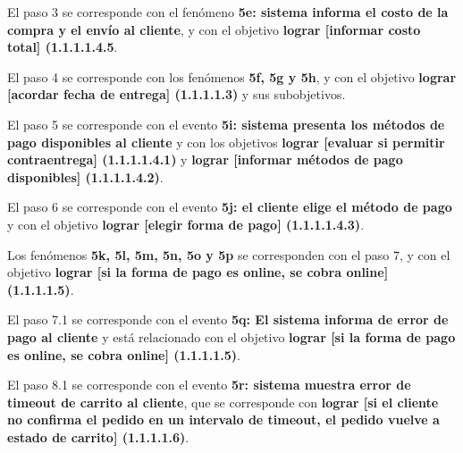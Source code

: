 El paso 3 se corresponde con el fenómeno \textbf{5e: sistema informa el costo de la compra y el envío al cliente}, y con el objetivo \textbf{lograr [informar costo total] (1.1.1.1.4.5}.

El paso 4 se corresponde con los fenómenos \textbf{5f, 5g y 5h}, y con el objetivo \textbf{lograr [acordar fecha de entrega] (1.1.1.1.3)} y sus subobjetivos.

El paso 5 se corresponde con el evento \textbf{5i: sistema presenta los métodos de pago disponibles al cliente} y con los objetivos \textbf{lograr [evaluar si permitir contraentrega] (1.1.1.1.4.1)} y \textbf{lograr [informar métodos de pago disponibles] (1.1.1.1.4.2)}.

El paso 6 se corresponde con el evento \textbf{5j: el cliente elige el método de pago} y con el objetivo \textbf{lograr [elegir forma de pago] (1.1.1.1.4.3)}.

Los fenómenos \textbf{5k, 5l, 5m, 5n, 5o y 5p} se corresponden con el paso 7, y con el objetivo \textbf{lograr [si la forma de pago es online, se cobra online] (1.1.1.1.5)}. 

El paso 7.1 se corresponde con el evento \textbf{5q: El sistema informa de error de pago al cliente} y está relacionado con el objetivo \textbf{lograr [si la forma de pago es online, se cobra online] (1.1.1.1.5)}.

El paso 8.1 se corresponde con el evento \textbf{5r: sistema muestra error de timeout de carrito al cliente}, que se corresponde con \textbf{lograr [si el cliente no confirma el pedido en un intervalo de timeout, el pedido vuelve a estado de carrito] (1.1.1.1.6)}.

%
%
\begin{casodeuso}
  \cupost{}
\end{casodeuso}

%
%
\begin{casodeuso}
\end{casodeuso}

